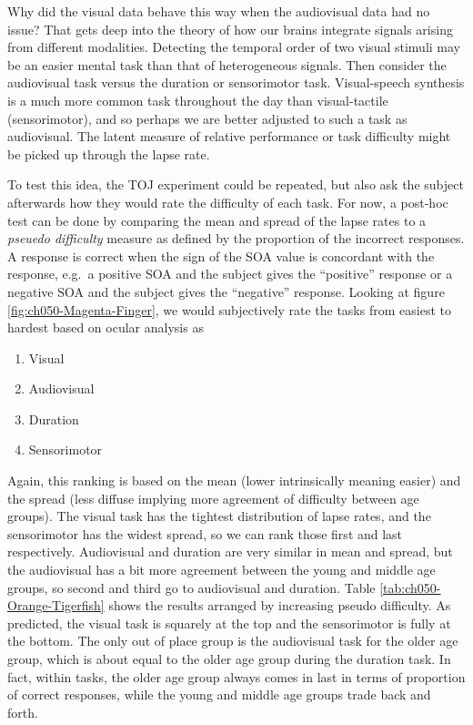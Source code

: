 \documentclass[11pt, oneside, openany]{scrbook}
\providecommand{\tightlist}{%
  \setlength{\itemsep}{0pt}\setlength{\parskip}{0pt}}
\begin{document}
Why did the visual data behave this way when the audiovisual data had no issue? That gets deep into the theory of how our brains integrate signals arising from different modalities. Detecting the temporal order of two visual stimuli may be an easier mental task than that of heterogeneous signals. Then consider the audiovisual task versus the duration or sensorimotor task. Visual-speech synthesis is a much more common task throughout the day than visual-tactile (sensorimotor), and so perhaps we are better adjusted to such a task as audiovisual. The latent measure of relative performance or task difficulty might be picked up through the lapse rate.

To test this idea, the TOJ experiment could be repeated, but also ask the subject afterwards how they would rate the difficulty of each task. For now, a post-hoc test can be done by comparing the mean and spread of the lapse rates to a \emph{pseuedo difficulty} measure as defined by the proportion of the incorrect responses. A response is correct when the sign of the SOA value is concordant with the response, e.g.~a positive SOA and the subject gives the ``positive'' response or a negative SOA and the subject gives the ``negative'' response. Looking at figure \ref{fig:ch050-Magenta-Finger}, we would subjectively rate the tasks from easiest to hardest based on ocular analysis as

\begin{enumerate}
\def\labelenumi{\arabic{enumi}.}
\tightlist
\item
  Visual
\item
  Audiovisual
\item
  Duration
\item
  Sensorimotor
\end{enumerate}

Again, this ranking is based on the mean (lower intrinsically meaning easier) and the spread (less diffuse implying more agreement of difficulty between age groups). The visual task has the tightest distribution of lapse rates, and the sensorimotor has the widest spread, so we can rank those first and last respectively. Audiovisual and duration are very similar in mean and spread, but the audiovisual has a bit more agreement between the young and middle age groups, so second and third go to audiovisual and duration. Table \ref{tab:ch050-Orange-Tigerfish} shows the results arranged by increasing pseudo difficulty. As predicted, the visual task is squarely at the top and the sensorimotor is fully at the bottom. The only out of place group is the audiovisual task for the older age group, which is about equal to the older age group during the duration task. In fact, within tasks, the older age group always comes in last in terms of proportion of correct responses, while the young and middle age groups trade back and forth.
\end{document}

